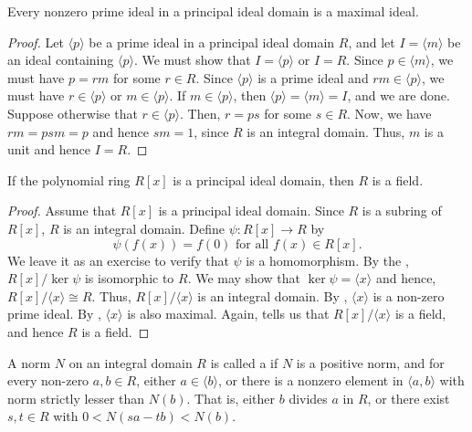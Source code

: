 \begin{prop} \label{prop:prime-is-maximal-PID}
    Every nonzero prime ideal in a principal ideal domain is a maximal ideal.
\end{prop}
\begin{proof}
    Let $\langle p \rangle$ be a prime ideal in a principal ideal domain $R$, and let $I = \langle m \rangle$ be an ideal containing $\langle p \rangle$. We must show that $I = \langle p \rangle$ or $I = R$. Since $p \in \langle m \rangle$, we must have $p = rm$ for some $r \in R$. Since $\langle p \rangle$ is a prime ideal and $rm \in \langle p \rangle$, we must have $r \in \langle p \rangle$ or $m \in \langle p \rangle$. If $m \in \langle p \rangle$, then $\langle p \rangle = \langle m \rangle = I$, and we are done. Suppose otherwise that $r \in \langle p \rangle$. Then, $r = ps$ for some $s \in R$. Now, we have $rm = psm = p$ and hence $sm = 1$, since $R$ is an integral domain. Thus, $m$ is a unit and hence $I = R$. 
\end{proof}

\begin{cor}
If the polynomial ring $R[x]$ is a principal ideal domain, then $R$ is a field.
\end{cor}
\begin{proof}
    Assume that $R[x]$ is a principal ideal domain. Since $R$ is a subring of $R[x]$, $R$ is an integral domain. Define $\psi \colon R[x] \to R$ by
    \[
        \psi\left( f(x) \right) = f(0) \text{ for all } f(x) \in R[x].
    \]
    We leave it as an exercise to verify that $\psi$ is a homomorphism. By the , $R[x] / \ker\psi$ is isomorphic to $R$. We may show that $\ker\psi = \langle x \rangle$ and hence, $R[x] / \langle x \rangle \cong R$. Thus, $R[x] / \langle x \rangle$ is an integral domain. By , $\langle x \rangle$ is a non-zero prime ideal. By , $\langle x \rangle$ is also maximal. Again,  tells us that $R[x] / \langle x \rangle$ is a field, and hence $R$ is a field.
\end{proof}

\begin{defn}
    A norm $N$ on an integral domain $R$ is called a  if $N$ is a positive norm, and for every non-zero $a,b \in R$, either $a \in \langle b \rangle$, or there is a nonzero element in $\langle a,b \rangle$ with norm strictly lesser than $N(b)$. That is, either $b$ divides $a$ in $R$, or there exist $s,t \in R$ with $0 < N(sa - tb) < N(b)$.
\end{defn}

